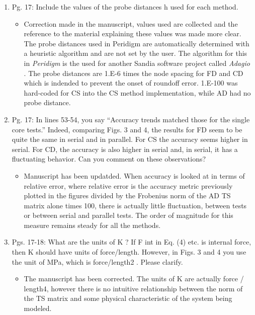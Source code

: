\documentclass{article}
\begin{document}
\begin{enumerate}
  \item
    Pg. 17: Include the values of the probe distances h used for each method.

{\color{red}  
\begin{itemize}
     \item
    Correction made in the manuscript, values used are collected and the reference to the material explaining these values was made more clear.
    The probe distances used in Peridigm are automatically determined with a
    heuristic algorithm and are not set by the user. The algorithm for this in
    \emph{Peridigm} is the used for another Sandia software project called
    \emph{Adagio} \cite{ref-Adaggio}. The probe distances are 1.E-6 times the node spacing for FD and CD which is indended to prevent the onset of roundoff error.
    1.E-100 was hard-coded for CS into the CS method implementation, while AD had no probe distance.
  \end{itemize}}

  \item
    Pg. 17: In lines 53-54, you say “Accuracy trends matched those for the single core
    tests.” Indeed, comparing Figs. 3 and 4, the results for FD seem to be quite the
    same in serial and in parallel. For CS the accuracy seems higher in serial. For CD,
    the accuracy is also higher in serial and, in serial, it has a ﬂuctuating behavior. Can
    you comment on these observations?

{\color{red}  
\begin{itemize}
     \item
     	Manuscript has been updatded. When accuracy is looked at in terms of relative error, where relative error is the accuracy metric previously plotted in the figures divided by the Frobenius norm of the AD TS matrix alone times 100, there is actually little fluctuation, between tests or between serial and parallel tests. The order of magnitude for this measure remains steady for all the methods.
  \end{itemize}}

  \item
    Pgs. 17-18: What are the units of K ? If F int in Eq. (4) etc. is internal force, then K
    should have units of force/length. However, in Figs. 3 and 4 you use the unit of
    MPa, which is force/length2 . Please clarify.

{\color{red}  
\begin{itemize}
     \item
    The manuscript has been corrected. The units of K are actually force / length4, however there is no intuitive relationship between the norm of the TS matrix and some physical characteristic of the system being modeled.
  \end{itemize}}


\end{enumerate}
\end{document}
